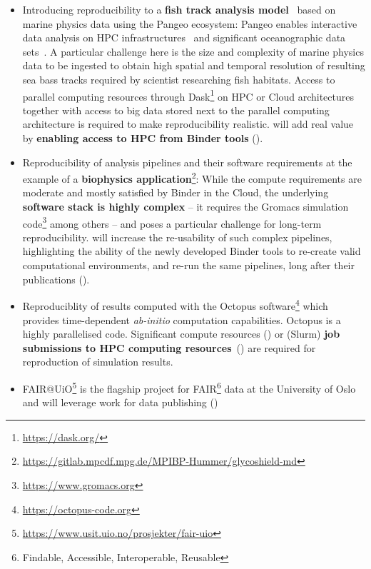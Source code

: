 \begin{itemize}
\item Introducing reproducibility to a \textbf{fish track analysis model}~\cite{woillez2016} based on
  marine physics data using the Pangeo ecosystem:
  Pangeo enables interactive data analysis on HPC infrastructures~\cite{odaka2020}
  and significant oceanographic data sets~\cite{maze2020}.
  A particular challenge here is
  the size and complexity of marine physics data to be ingested
  to obtain high spatial and temporal resolution of resulting sea bass tracks
  required by scientist researching fish habitats.
  Access to parallel computing resources through Dask\footnote{\url{https://dask.org/}} on HPC or
  Cloud architectures together with access to big data stored next to the
  parallel computing architecture is required to make reproducibility realistic.
  \TheProject will add real value by \textbf{enabling access to HPC from Binder tools} ().
\item Reproducibility of analysis pipelines and their software
  requirements at the example of a
  \textbf{biophysics application}\footnote{\url{https://gitlab.mpcdf.mpg.de/MPIBP-Hummer/glycoshield-md}}:
  While the compute requirements are moderate and mostly satisfied by Binder in the Cloud,
  the underlying \textbf{software stack is highly complex} -- it requires the Gromacs simulation
  code\footnote{\url{https://www.gromacs.org}} among others
  -- and poses a particular challenge for long-term reproducibility.
  \TheProject will increase the re-usability of such complex pipelines,
  highlighting the ability of the newly developed Binder tools to re-create valid computational environments,
  and re-run the same pipelines, long after their publications ().
\item Reproduciblity of results computed with the 
  Octopus software\footnote{\url{https://octopus-code.org}}
  which provides time-dependent \emph{ab-initio} computation capabilities.
  Octopus is a highly parallelised code. Significant compute resources
  () or 
  (Slurm) \textbf{job submissions to HPC computing
  resources}~() are required for 
  reproduction of simulation results.
\item FAIR@UiO\footnote{\url{https://www.usit.uio.no/prosjekter/fair-uio}} is the flagship project for FAIR\footnote{Findable, Accessible, Interoperable, Reusable}
  data at the University of Oslo and will leverage \TheProject work for data publishing ()

\end{itemize}

